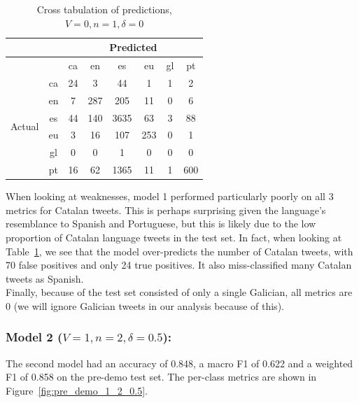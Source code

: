 \documentclass[runningheads]{llncs}
\begin{document}
\begin{table}
	\centering
	\caption{Cross tabulation of predictions, $V=0, n=1, \delta=0$}
	\label{tab:pre_demo_confusion_0_1_0}
	\begin{tabular}{|c|c|c|c|c|c|c|c|} \hline
		& & \multicolumn{6}{c|}{Predicted} \\ \hline
		& &  ca &   en &    es &   eu &  gl &   pt \\ \hline
		\multirow{6}{*}{Actual} & ca   &  24 &    3 &    44 &    1 &   1 &    2 \\
		& en   &   7 &  287 &   205 &   11 &   0 &    6 \\
		& es   &  44 &  140 &  3635 &   63 &   3 &   88 \\
		& eu   &   3 &   16 &   107 &  253 &   0 &    1 \\
		& gl   &   0 &    0 &     1 &    0 &   0 &    0 \\
		& pt   &  16 &   62 &  1365 &   11 &   1 &  600 \\ \hline
	\end{tabular}
\end{table}

When looking at weaknesses, model 1 performed particularly poorly on all 3 metrics for Catalan tweets. This is perhaps surprising given the language's resemblance to Spanish and Portuguese, but this is likely due to the low proportion of Catalan language tweets in the test set. In fact, when looking at Table~\ref{tab:pre_demo_confusion_0_1_0}, we see that the model over-predicts the number of Catalan tweets, with 70 false positives and only 24 true positives. It also miss-classified many Catalan tweets as Spanish. \\

Finally, because of the test set consisted of only a single Galician, all metrics are 0 (we will ignore Galician tweets in our analysis because of this).

\subsubsection{Model 2 ($V=1, n=2, \delta=0.5$): }
The second model had an accuracy of 0.848, a macro F1 of 0.622 and a weighted F1 of 0.858 on the pre-demo test set. The per-class metrics are shown in Figure~\ref{fig:pre_demo_1_2_0.5}.
\end{document}
